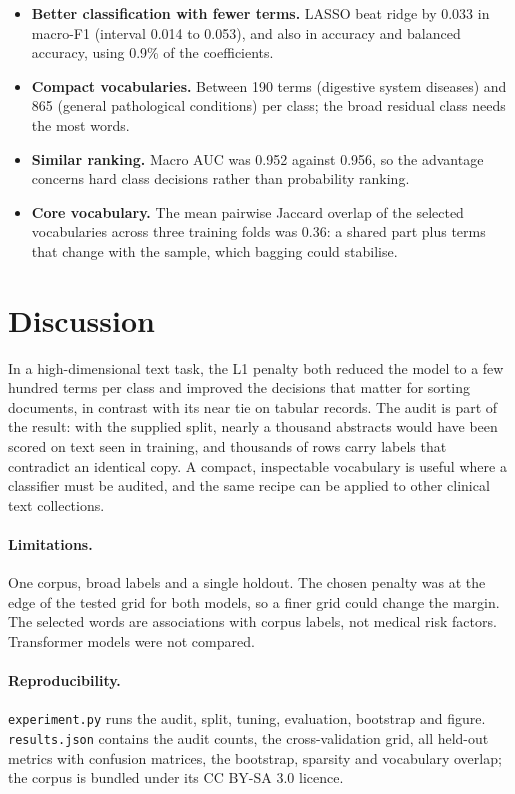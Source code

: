 \documentclass[11pt]{article}
\begin{document}
\begin{itemize}
\item \textbf{Better classification with fewer terms.} LASSO beat ridge by 0.033 in macro-F1 (interval 0.014 to
0.053), and also in accuracy and balanced accuracy, using 0.9\% of the coefficients.
\item \textbf{Compact vocabularies.} Between 190 terms (digestive system diseases) and 865 (general pathological
conditions) per class; the broad residual class needs the most words.
\item \textbf{Similar ranking.} Macro AUC was 0.952 against 0.956, so the advantage concerns hard class decisions
rather than probability ranking.
\item \textbf{Core vocabulary.} The mean pairwise Jaccard overlap of the selected vocabularies across three training
folds was 0.36: a shared part plus terms that change with the sample, which bagging could stabilise.
\end{itemize}

\section{Discussion}
In a high-dimensional text task, the L1 penalty both reduced the model to a few hundred terms per class and improved
the decisions that matter for sorting documents, in contrast with its near tie on tabular records. The audit is part of
the result: with the supplied split, nearly a thousand abstracts would have been scored on text seen in training, and
thousands of rows carry labels that contradict an identical copy. A compact, inspectable vocabulary is useful where
a classifier must be audited, and the same recipe can be applied to other clinical text collections.

\paragraph{Limitations.} One corpus, broad labels and a single holdout. The chosen penalty was at the edge of the
tested grid for both models, so a finer grid could change the margin. The selected words are associations with corpus
labels, not medical risk factors. Transformer models were not compared.

\paragraph{Reproducibility.} \texttt{experiment.py} runs the audit, split, tuning, evaluation, bootstrap and figure.
\texttt{results.json} contains the audit counts, the cross-validation grid, all held-out metrics with confusion
matrices, the bootstrap, sparsity and vocabulary overlap; the corpus is bundled under its CC BY-SA 3.0 licence.
\end{document}
